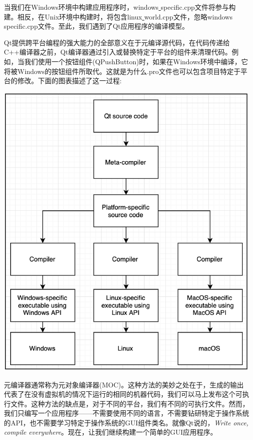 当我们在Windows环境中构建应用程序时，windows\underline{ }specific.cpp文件将参与构建。相反，在Unix环境中构建时，将包含linux\underline{ }world.cpp文件，忽略windows\underline{ }specific.cpp文件。至此，我们遇到了Qt应用程序的编译模型。 \par
Qt提供跨平台编程的强大能力的全部意义在于元编译源代码，在代码传递给C++编译器之前，Qt编译器通过引入或替换特定于平台的组件来清理代码。例如，当我们使用一个按钮组件(QPushButton)时，如果在Windows环境中编译，它将被Windows的按钮组件所取代。这就是为什么.pro文件也可以包含项目特定于平台的修改。下面的图表描述了这一过程: \par

\begin{center}
	\includegraphics[width=1.0\textwidth]{content/Section-2/Chapter-14/4}
\end{center}

元编译器通常称为元对象编译器(MOC)。这种方法的美妙之处在于，生成的输出代表了在没有虚拟机的情况下运行的相同的机器代码，我们可以马上发布这个可执行文件。这种方法的缺点是，对于不同的平台，我们有不同的可执行文件。然而，我们只编写一个应用程序——不需要使用不同的语言，不需要钻研特定于操作系统的API，也不需要学习特定于操作系统的GUI组件类名。就像Qt说的，\textit{Write once, compile everywhere}。现在，让我们继续构建一个简单的GUI应用程序。 \par

